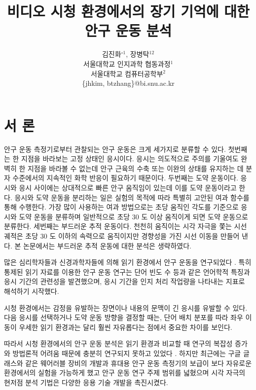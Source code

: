 \documentclass{kcc}
\title{비디오 시청 환경에서의 장기 기억에 대한 안구 운동 분석}
\author{
김진화$^{\circ1}$, 장병탁$^{12}$\\
서울대학교 인지과학 협동과정$^{1}$\\
서울대학교 컴퓨터공학부$^{2}$\\
\{jhkim, btzhang\}@bi.snu.ac.kr
}
\begin{document}
\maketitle


\section{서 론}

안구 운동 측정기로부터 관찰되는 안구 운동은 크게 세가지로 분류할 수 있다. 첫번째는 한 지점을 바라보는 고정 상태인 응시이다. 응시는 의도적으로 주의를 기울여도 완벽히 한 지점을 바라볼 수 없는데 안구 근육의 수축 또는 이완의 상태를 유지하는 데 분자 수준에서의 지속적인 화학 반응이 필요하기 때문이다. 두번째는 도약 운동이다. 응시와 응시 사이에는 상대적으로 빠른 안구 움직임이 있는데 이를 도약 운동이라고 한다. 응시와 도약 운동을 분리하는 일은 실험의 목적에 따라 특별히 고안된 여과 함수를 통해 수행한다. 가장 많이 사용하는 여과 방법으로는 초당 움직인 각도를 기준으로 응시와 도약 운동을 분류하며 일반적으로 초당 30 도 이상 움직이게 되면 도약 운동으로 분류한다. 세번째는 부드러운 추적 운동이다. 천천히 움직이는 시각 자극을 쫓는 시선 궤적은 초당 30 도 이하의 속력으로 움직이지만 경향성을 가진 시선 이동을 만들어 낸다. 본 논문에서는 부드러운 추적 운동에 대한 분석은 생략하였다.

많은 심리학자들과 신경과학자들에 의해 읽기 환경에서 안구 운동을 연구되었다 \cite{Rayner1998,Reichle1998}. 특히 통제된 읽기 자료를 이용한 안구 운동 연구\cite{Inhoff1986,Rayner1986}는 단어 빈도 수 등과 같은 언어학적 특징과 응시 기간의 관련성을 발견했으며, 응시 기간을 인지 처리 작업량을 나타내는 지표로 해석하기 시작했다. 

시청 환경에서는 감정을 유발하는 장면이나 내용의 문맥이 긴 응시를 유발할 수 있다. 다음 응시를 선택하거나 도약 운동 방향을 결정할 때는, 단어 배치 분포를 따라 좌우 이동이 우세한 읽기 환경과는 달리 훨씬 자유롭다는 점에서 중요한 차이를 보인다.

따라서 시청 환경에서의 안구 운동 분석은 읽기 환경과 비교할 때 연구의 복잡성 증가\cite{Choe2013}와 방법론적 어려움 때문에 충분히 연구되지 못하고 있었다 \cite{Tatler2011}. 하지만 최근에는 구글 글래스와 같은 웨어러블 장비의 개발과 휴대용 안구 운동 측정기의 보급이 보다 자유로운 환경에서의 실험을 가능하게 했고 안구 운동 연구 주제 범위를 넓혔으며 시각 자극의 현저점 분석 기법\cite{itti1998model}은 다양한 응용 기술 개발을 촉진시켰다. 
\end{document}
